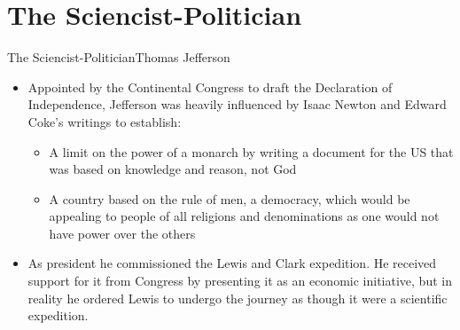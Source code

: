 \section{The Sciencist-Politician}
\begin{frame}{The Sciencist-Politician}{Thomas Jefferson}
	\begin{itemize}
		\item Appointed by the Continental Congress to draft the Declaration of Independence, Jefferson was heavily influenced by Isaac Newton and Edward Coke's writings to establish:
			\begin{itemize}
				\item A limit on the power of a monarch by writing a document for the US that was based on knowledge and reason, not God
				\item A country based on the rule of men, a democracy, which would be appealing to people of all religions and denominations as one would not have power over the others
			\end{itemize}
		\item As president he commissioned the Lewis and Clark expedition. He received support for it from Congress by presenting it as an economic initiative, but in reality he ordered Lewis to undergo the journey as though it were a scientific expedition.
	\end{itemize}
\end{frame}

